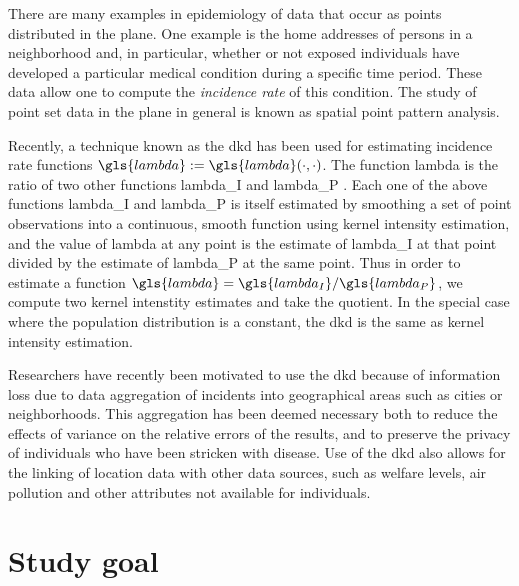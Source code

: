 

There are many examples in epidemiology of data that occur as points distributed in the plane.
One example is
the home addresses of persons in a neighborhood and,
in particular,
whether or not exposed individuals have developed a particular medical condition during a specific time period.
These data allow one to compute the \textit{\gls{incidence rate}} of this condition.
The study of point set data in the plane in general is known as spatial point pattern analysis.

Recently, a technique known as the \gls{dkd} has been used for estimating \gls{incidence rate} functions
$\gls{lambda} := \gls{lambda}\dotdot$.
The function \gls{lambda} is the ratio of two other functions \gls{lambda_I} and \gls{lambda_P} \citep{portnov2009studying,kloog2009using,zusman2012residential}.
Each one of the above functions \gls{lambda_I} and \gls{lambda_P}
is itself estimated by smoothing a set of point observations into a continuous,
smooth function \citep{bithell1990application} using \gls{kernel intensity estimation},
and the value of \gls{lambda} at any point is the estimate of \gls{lambda_I} at that point
divided by the estimate of \gls{lambda_P} at the same point.
Thus in order to estimate a function $\gls{lambda} = \gls{lambda_I}/\gls{lambda_P}$,
we compute two kernel intenstity estimates and take the quotient.
In the special case where the population distribution is a constant,
the \gls{dkd} is the same as \gls{kernel intensity estimation}.

Researchers have recently been motivated to use the \gls{dkd} because of information loss
due to data aggregation of incidents into geographical areas such as cities or neighborhoods.
This aggregation has been deemed necessary both
to reduce the effects of variance on the relative errors of the results,
and to preserve the privacy of individuals who have been stricken with disease.
Use of the \gls{dkd} also allows for the linking of location data with other data sources,
such as welfare levels, air pollution and other attributes not available for individuals.

\section{Study goal}
\label{sec:introduction:goal}

